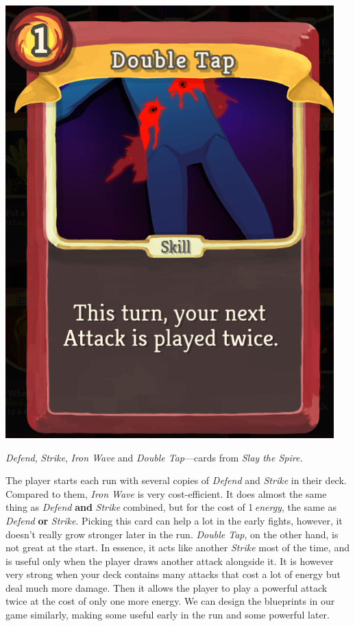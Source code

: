 \begin{center}
\begin{minipage}{.25\textwidth}
        \includegraphics[width=0.95\textwidth]{img/Slay-the-Spire-Double-Tap.png}
        \label{fig:sts-double-tap}
    \end{minipage}
    \caption{\emph{Defend}, \emph{Strike}, \emph{Iron Wave} and \emph{Double Tap}---cards from \emph{Slay the Spire.}}
\end{center}

The player starts each run with several copies of \emph{Defend} and \emph{Strike} in their deck.
Compared to them, \emph{Iron Wave} is very cost-efficient.
It does almost the same thing as \emph{Defend} \textbf{and} \emph{Strike} combined, but for the cost of 1\,\emph{energy}, the same as \emph{Defend} \textbf{or} \emph{Strike}.
Picking this card can help a lot in the early fights, however, it doesn't really grow stronger later in the run.
\emph{Double Tap}, on the other hand, is not great at the start.
In essence, it acts like another \emph{Strike} most of the time, and is useful only when the player draws another attack alongside it.
It is however very strong when your deck contains many attacks that cost a lot of energy but deal much more damage.
Then it allows the player to play a powerful attack twice at the cost of only one more energy.
We can design the blueprints in our game similarly, making some useful early in the run and some powerful later.

